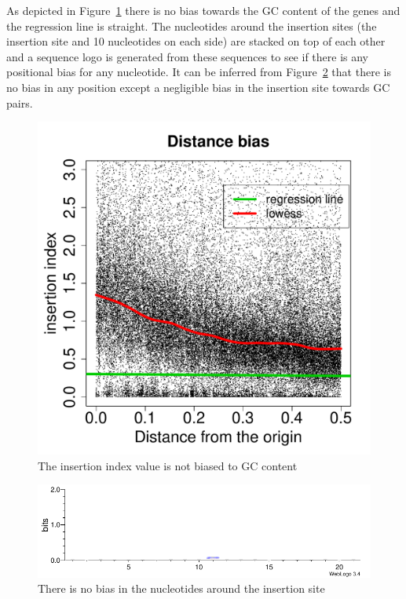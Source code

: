 \documentclass[a4paper,10pt, twocolumn]{article}
\begin{document}
As depicted in Figure~\ref{fig:GC_bias} there is no bias towards the GC content of the genes and the regression line is straight. The nucleotides around the insertion sites (the insertion site and 10 nucleotides on each side) are stacked on top of each other and a sequence logo is generated from these sequences to see if there is any positional bias for any nucleotide. It can be inferred from Figure~\ref{fig:logo} that there is no bias in any position except a negligible bias in the insertion site towards GC pairs. 
\begin{figure}[H]
\includegraphics[scale=0.3, page=2]{biases.pdf}
\caption{The insertion index value is not biased to GC content}
\label{fig:GC_bias}
\end{figure}

\begin{figure}
\includegraphics[scale=1.2]{logo.pdf}
\caption{There is no bias in the nucleotides around the insertion site}
\label{fig:logo}
\end{figure}
\end{document}
